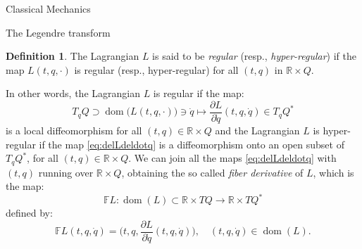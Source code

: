 \documentclass[oneside,a4paper,11pt]{amsbook}
\newcommand{\R}{\mathds R}
\DeclareMathOperator{\Dom}{dom}
\theoremstyle{remark}\newtheorem{exercise}{Exercise}[chapter]
\theoremstyle{plain}\newtheorem{teo}{Theorem}[section]
\theoremstyle{plain}\newtheorem{lem}[teo]{Lemma}
\theoremstyle{plain}\newtheorem{prop}[teo]{Proposition}
\theoremstyle{plain}\newtheorem{cor}[teo]{Corollary}
\theoremstyle{definition}\newtheorem{defin}[teo]{Definition}
\theoremstyle{remark}\newtheorem{rem}[teo]{Remark}
\theoremstyle{definition}\newtheorem{notation}[teo]{Notation}
\theoremstyle{definition}\newtheorem{convention}[teo]{Convention}
\theoremstyle{definition}\newtheorem{example}[teo]{Example}
\numberwithin{section}{chapter}
\numberwithin{equation}{section}
\begin{document}
\begin{chapter}{Classical Mechanics}
\begin{section}{The Legendre transform}
\begin{defin}
The Lagrangian $L$ is said to be {\em regular\/} (resp., {\em hyper-regular}) if the map $L(t,q,\cdot)$ is regular (resp., hyper-regular) for all
$(t,q)$ in $\R\times Q$.
\end{defin}
In other words, the Lagrangian $L$ is regular if the map:
\begin{equation}\label{eq:delLdeldotq}
T_qQ\supset\Dom\!\big(L(t,q,\cdot)\big)\ni\dot q\longmapsto\frac{\partial L}{\partial\dot q}(t,q,\dot q)\in T_qQ^*
\end{equation}
is a local diffeomorphism for all $(t,q)\in\R\times Q$ and the Lagrangian $L$ is hyper-regular if the map \eqref{eq:delLdeldotq} is
a diffeomorphism onto an open subset of $T_qQ^*$, for all $(t,q)\in\R\times Q$. We can join all the maps \eqref{eq:delLdeldotq} with $(t,q)$ running
over $\R\times Q$, obtaining the so called {\em fiber derivative\/} of $L$, which is the map:
\[\mathbb FL:\Dom(L)\subset\R\times TQ\longrightarrow\R\times TQ^*\]
defined by:
\[\mathbb FL(t,q,\dot q)=\Big(t,q,\frac{\partial L}{\partial\dot q}(t,q,\dot q)\Big),\quad(t,q,\dot q)\in\Dom(L).\]


\end{section}
\end{chapter}
\end{document}
